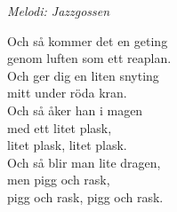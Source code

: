 {\footnotesize\textit{Melodi: Jazzgossen}}\par
\vspace{10pt}
Och så kommer det en geting\\
genom luften som ett reaplan.\\
Och ger dig en liten snyting\\
mitt under röda kran.\\
Och så åker han i magen\\
med ett litet plask,\\
litet plask, litet plask.\\
Och så blir man lite dragen,\\
men pigg och rask,\\
pigg och rask, pigg och rask.
